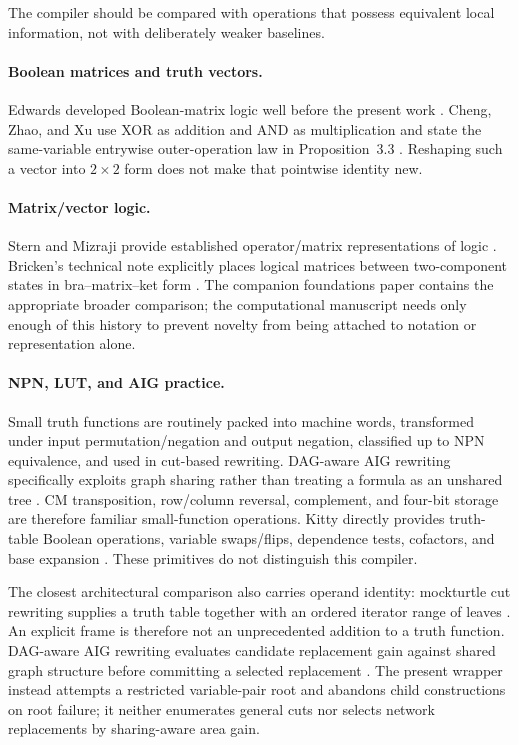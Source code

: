 \documentclass[10pt]{article}
\theoremstyle{plain}
\theoremstyle{definition}
\theoremstyle{remark}
\begin{document}
The compiler should be compared with operations that possess equivalent local information, not with deliberately weaker baselines.

\paragraph{Boolean matrices and truth vectors.}
Edwards developed Boolean-matrix logic well before the present work \cite{Edwards1972}. Cheng, Zhao, and Xu use XOR as addition and AND as multiplication and state the same-variable entrywise outer-operation law in Proposition~3.3 \cite{Cheng2011}. Reshaping such a vector into $2\times2$ form does not make that pointwise identity new.

\paragraph{Matrix/vector logic.}
Stern and Mizraji provide established operator/matrix representations of logic \cite{Stern1988,Mizraji1992,Mizraji2008}. Bricken's technical note explicitly places logical matrices between two-component states in bra--matrix--ket form \cite{Bricken1997}. The companion foundations paper contains the appropriate broader comparison; the computational manuscript needs only enough of this history to prevent novelty from being attached to notation or representation alone.

\paragraph{NPN, LUT, and AIG practice.}
Small truth functions are routinely packed into machine words, transformed under input permutation/negation and output negation, classified up to NPN equivalence, and used in cut-based rewriting. DAG-aware AIG rewriting specifically exploits graph sharing rather than treating a formula as an unshared tree \cite{Mishchenko2006,Zhou2019,Testa2019}. CM transposition, row/column reversal, complement, and four-bit storage are therefore familiar small-function operations. Kitty directly provides truth-table Boolean operations, variable swaps/flips, dependence tests, cofactors, and base expansion \cite{KittyOperations}. These primitives do not distinguish this compiler.

The closest architectural comparison also carries operand identity: mockturtle cut rewriting supplies a truth table together with an ordered iterator range of leaves \cite{MockturtleCut}. An explicit frame is therefore not an unprecedented addition to a truth function. DAG-aware AIG rewriting evaluates candidate replacement gain against shared graph structure before committing a selected replacement \cite{Mishchenko2006}. The present wrapper instead attempts a restricted variable-pair root and abandons child constructions on root failure; it neither enumerates general cuts nor selects network replacements by sharing-aware area gain.
\end{document}
